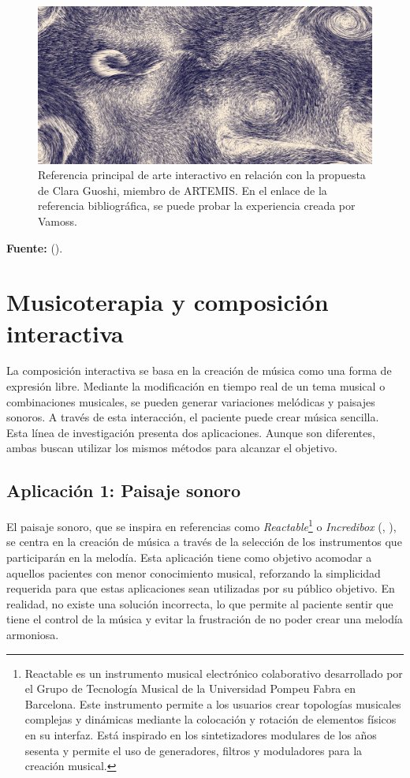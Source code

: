 \begin{figure}[h!]
	\centering
	\includegraphics[width=0.4\linewidth]{Figuras/Desarrollo/MarParticulas.png}
	\caption[Referencia principal de arte interactivo Vamoss.]{Referencia principal de arte interactivo en relación con la propuesta de Clara Guoshi, miembro de ARTEMIS. En el enlace de la referencia bibliográfica, se puede probar la experiencia creada por Vamoss.}
	\label{fig:SeaParticles}
	\vspace{-40pt}
\end{figure}

\begin{center}
	\textbf{Fuente:} \citeauthor{VAMOSS:2023} (\citeyear{VAMOSS:2023}).
\end{center}

\section{Musicoterapia y composición interactiva}

La composición interactiva se basa en la creación de música como una forma de expresión libre. Mediante la modificación en tiempo real de un tema musical o combinaciones musicales, se pueden generar variaciones melódicas y paisajes sonoros. A través de esta interacción, el paciente puede crear música sencilla. Esta línea de investigación presenta dos aplicaciones. Aunque son diferentes, ambas buscan utilizar los mismos métodos para alcanzar el objetivo.

\subsection{Aplicación 1: Paisaje sonoro}

El paisaje sonoro, que se inspira en referencias como \textit{Reactable}\footnote{Reactable es un instrumento musical electrónico colaborativo desarrollado por el Grupo de Tecnología Musical de la Universidad Pompeu Fabra en Barcelona. Este instrumento permite a los usuarios crear topologías musicales complejas y dinámicas mediante la colocación y rotación de elementos físicos en su interfaz. Está inspirado en los sintetizadores modulares de los años sesenta y permite el uso de generadores, filtros y moduladores para la creación musical.} o \textit{Incredibox} (\citeauthor{INCREDIBOX:2023}, \citeyear{INCREDIBOX:2023}), se centra en la creación de música a través de la selección de los instrumentos que participarán en la melodía. Esta aplicación tiene como objetivo acomodar a aquellos pacientes con menor conocimiento musical, reforzando la simplicidad requerida para que estas aplicaciones sean utilizadas por su público objetivo. En realidad, no existe una solución incorrecta, lo que permite al paciente sentir que tiene el control de la música y evitar la frustración de no poder crear una melodía armoniosa.

